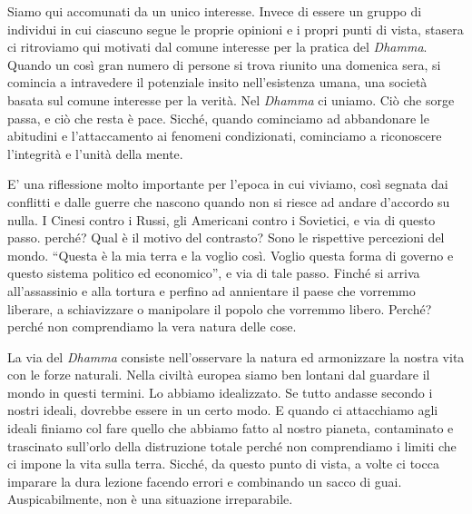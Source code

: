 
Siamo qui accomunati da un unico interesse. Invece di essere un gruppo
di individui in cui ciascuno segue le proprie opinioni e i propri punti
di vista, stasera ci ritroviamo qui motivati dal comune interesse per la
pratica del \textit{Dhamma}. Quando un così gran numero di persone si trova
riunito una domenica sera, si comincia a intravedere il potenziale
insito nell'esistenza umana, una società basata sul comune interesse per
la verità. Nel \textit{Dhamma} ci uniamo. Ciò che sorge passa, e ciò che resta è
pace. Sicché, quando cominciamo ad abbandonare le abitudini e
l'attaccamento ai fenomeni condizionati, cominciamo a riconoscere
l'integrità e l'unità della mente.

E' una riflessione molto importante per l'epoca in cui viviamo, così
segnata dai conflitti e dalle guerre che nascono quando non si riesce ad
andare d'accordo su nulla. I Cinesi contro i Russi, gli Americani contro
i Sovietici, e via di questo passo. perché? Qual è il motivo del
contrasto? Sono le rispettive percezioni del mondo. ``Questa è la mia
terra e la voglio così. Voglio questa forma di governo e questo sistema
politico ed economico'', e via di tale passo. Finché si arriva
all'assassinio e alla tortura e perfino ad annientare il paese che
vorremmo liberare, a schiavizzare o manipolare il popolo che vorremmo
libero. Perché? perché non comprendiamo la vera natura delle cose.

La via del \textit{Dhamma} consiste nell'osservare la natura ed armonizzare la
nostra vita con le forze naturali. Nella civiltà europea siamo ben
lontani dal guardare il mondo in questi termini. Lo abbiamo idealizzato.
Se tutto andasse secondo i nostri ideali, dovrebbe essere in un certo
modo. E quando ci attacchiamo agli ideali finiamo col fare quello che
abbiamo fatto al nostro pianeta, contaminato e trascinato sull'orlo
della distruzione totale perché non comprendiamo i limiti che ci impone
la vita sulla terra. Sicché, da questo punto di vista, a volte ci tocca
imparare la dura lezione facendo errori e combinando un sacco di guai.
Auspicabilmente, non è una situazione irreparabile.

